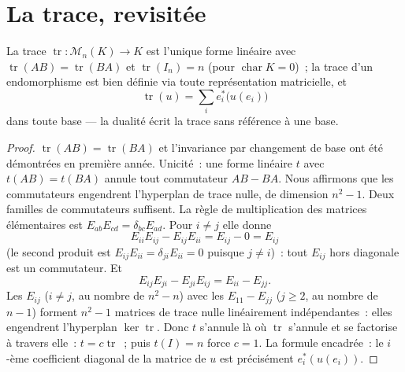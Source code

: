 \section{La trace, revisitée}

\begin{proposition}\label{prop:b2:linalg:trace}
La trace $\operatorname{tr} \colon \mathcal{M}_n(K) \to K$ est
l'unique forme linéaire avec $\operatorname{tr}(AB) =
\operatorname{tr}(BA)$ et $\operatorname{tr}(I_n) = n$ (pour
$\operatorname{char} K = 0$)~; la trace d'un endomorphisme est
bien définie via toute représentation matricielle, et
\[
\operatorname{tr}(u) = \sum_{i} e_i^*\bigl(u(e_i)\bigr)
\]
dans toute base --- la dualité écrit la trace sans référence à une base.
\end{proposition}

\begin{proof}
$\operatorname{tr}(AB) = \operatorname{tr}(BA)$ et l'invariance par
changement de base ont été démontrées en première année. Unicité~: une
forme linéaire $t$ avec $t(AB) = t(BA)$ annule tout commutateur $AB -
BA$. Nous affirmons que les commutateurs engendrent l'hyperplan de
trace nulle, de dimension $n^2 - 1$. Deux familles de commutateurs
suffisent. La règle de multiplication des matrices élémentaires est
$E_{ab}E_{cd} = \delta_{bc}E_{ad}$. Pour $i \neq j$ elle donne
\[
E_{ii}E_{ij} - E_{ij}E_{ii} = E_{ij} - 0 = E_{ij}
\]
(le second produit est $E_{ij}E_{ii} = \delta_{ji}E_{ii} = 0$
puisque $j \neq i$)~: tout $E_{ij}$ hors diagonale est un commutateur.
Et
\[
E_{ij}E_{ji} - E_{ji}E_{ij} = E_{ii} - E_{jj} .
\]
Les $E_{ij}$ ($i \neq j$, au nombre de $n^2 - n$) avec les
$E_{11} - E_{jj}$ ($j \geq 2$, au nombre de $n - 1$) forment $n^2 - 1$
matrices de trace nulle linéairement indépendantes~: elles engendrent
l'hyperplan $\ker\operatorname{tr}$. Donc $t$ s'annule là où
$\operatorname{tr}$ s'annule et se factorise à travers elle~: $t =
c\operatorname{tr}$~; puis $t(I) = n$ force $c = 1$. La formule
encadrée~: le $i$-ème coefficient diagonal de la matrice de $u$ est
précisément $e_i^*(u(e_i))$.
\end{proof}

